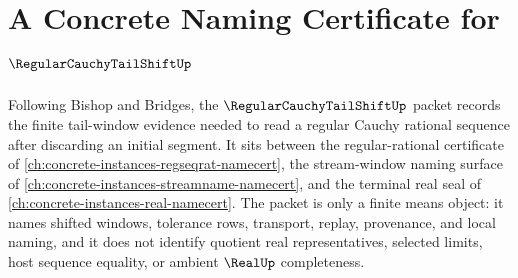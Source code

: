 \chapter{A Concrete Naming Certificate for $\RegularCauchyTailShiftUp$}
\label{ch:concrete-instances-regular-cauchy-tail-shift-namecert}

Following Bishop and Bridges, the $\RegularCauchyTailShiftUp$ packet records the finite tail-window evidence needed to read a regular Cauchy rational sequence after discarding an initial segment. It sits between the regular-rational certificate of \autoref{ch:concrete-instances-regseqrat-namecert}, the stream-window naming surface of \autoref{ch:concrete-instances-streamname-namecert}, and the terminal real seal of \autoref{ch:concrete-instances-real-namecert}. The packet is only a finite means object: it names shifted windows, tolerance rows, transport, replay, provenance, and local naming, and it does not identify quotient real representatives, selected limits, host sequence equality, or ambient $\RealUp$ completeness.

